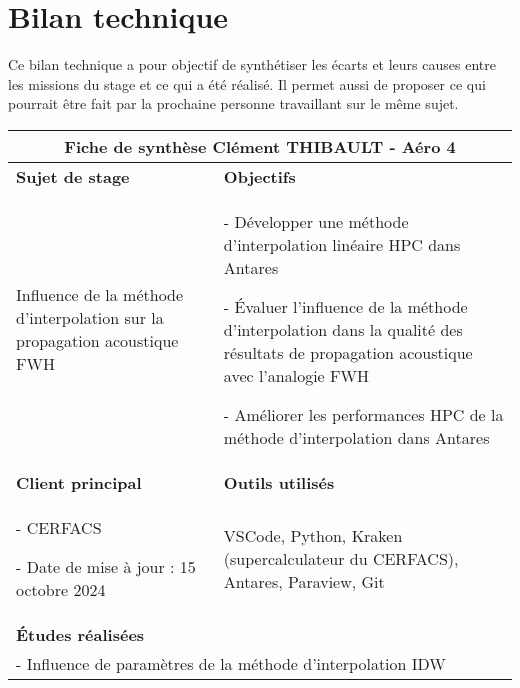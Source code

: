 \section*{Bilan technique}
Ce bilan technique a pour objectif de synthétiser les écarts et leurs causes entre les missions du stage et ce qui a été réalisé.
Il permet aussi de proposer ce qui pourrait être fait par la prochaine personne travaillant sur le même sujet.


\begin{table}[ht]
\centering
\begin{tabular}{|p{6.5cm}|p{8.5cm}|}
\hline


\multicolumn{2}{|c|}{\textbf{Fiche de synthèse}   \hspace{7cm}   Clément THIBAULT - Aéro 4} \\ 
\hline
\textbf{Sujet de stage} & \textbf{Objectifs} \\ 
\hline


\begin{minipage}[t]{6.5cm}
Influence de la méthode d’interpolation sur la propagation acoustique FWH
\end{minipage} & 
\begin{minipage}[t]{8.5cm}
- Développer une méthode d’interpolation linéaire HPC dans Antares

- Évaluer l’influence de la méthode d’interpolation dans la qualité des résultats de propagation acoustique avec l’analogie FWH

- Améliorer les performances HPC de la méthode d’interpolation dans Antares
\end{minipage} \\ 
\hline
\textbf{Client principal} & \textbf{Outils utilisés} \\ 
\hline
\begin{minipage}[t]{6.5cm}
- CERFACS

- Date de mise à jour : 15 octobre 2024
\end{minipage} & 
\begin{minipage}[t]{8.5cm}
VSCode, Python, Kraken (supercalculateur du CERFACS), Antares, Paraview, Git
\end{minipage} \\ 
\hline
\multicolumn{2}{|l|}{\textbf{Études réalisées}} \\ 
\hline
\multicolumn{2}{|p{14cm}|}{
\begin{minipage}[t]{14cm}
- Influence de paramètres de la méthode d'interpolation IDW


\end{minipage}}
\end{tabular}
\end{table}
